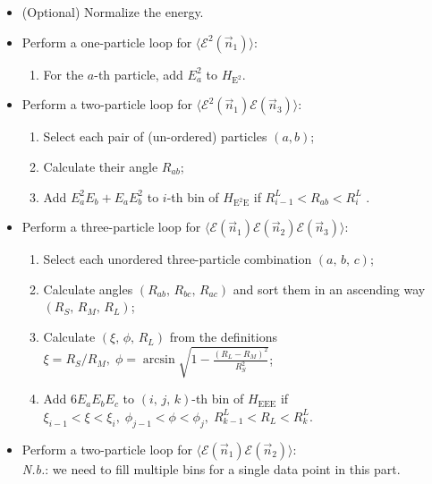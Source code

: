\documentclass[letterpaper,11pt]{article}
\begin{document}
\begin{enumerate}
  \begin{itemize}
  \item  (Optional) Normalize the energy.
  \item
    {Perform a one-particle loop for \(\langle\mathcal{E}^2(\vec{n}_1)\rangle\)}:
    \begin{enumerate}
    	\item For the \(a\)-th particle, add \(E_a^2\) to \(H_{\mathrm{E^2}}\).
	 \end{enumerate}
  \item Perform a two-particle loop for \(\langle\mathcal{E}^2(\vec{n}_1)\mathcal{E}(\vec{n}_3)\rangle\):
	\begin{enumerate}
   	 \item Select each pair of (un-ordered) particles \((a,b)\);
    \item  Calculate their angle \(R_{ab}\);
   \item Add \(E_a^2 E_b + E_a E_b^2\) to \(i\)-th bin of    \(H_{\mathrm{E^2E}}\) if \(R^L_{i-1}<R_{ab}<R^L_{i}\) .
    \end{enumerate}
  \item Perform a three-particle loop for    \(\langle\mathcal{E}(\vec{n}_1)\mathcal{E}(\vec{n}_2)\mathcal{E}(\vec{n}_3)\rangle\):
    	\begin{enumerate}

    \item Select each unordered three-particle combination
    \((a,\,b,\,c)\);

   \item Calculate angles \((R_{ab},\,R_{bc},\,R_{ac})\) and
    sort them in an ascending way \((R_S,\,R_M,\,R_L)\);

    \item Calculate \((\xi,\,\phi,\, R_L)\) from the
    definitions
    \(\xi = R_S/R_M,\;\phi = \arcsin \sqrt{1-\frac{(R_L-R_M)^2}{R_S^2}}\);

   \item Add \(6 E_a E_b E_c\) to \((i,\,j,\,k)\)-th bin of
    \(H_{\mathrm{EEE}}\) if
    \(\xi_{i-1} < \xi < \xi_{i},\;\phi_{j-1} < \phi < \phi_{j},\; R^L_{k-1}<R_L < R^L_{k}\).
    
        \end{enumerate}

  \item Perform a two-particle loop for \(\langle\mathcal{E}(\vec{n}_1)\mathcal{E}(\vec{n}_2)\rangle\): \\
      {\emph{N.b.}: we need to fill multiple bins for a single data point in this part.}


\end{itemize}
\end{enumerate}
\end{document}
